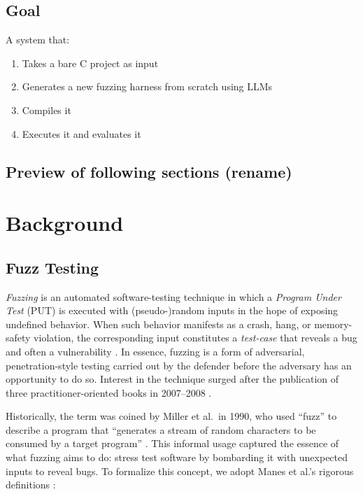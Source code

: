 \documentclass[
  a4paper,
  DIV=11,
  numbers=noendperiod]{scrreprt}
\providecommand{\tightlist}{%
  \setlength{\itemsep}{0pt}\setlength{\parskip}{0pt}}
\theoremstyle{definition}
\theoremstyle{remark}
\begin{document}
\section{Goal}\label{goal}

A system that:

\begin{enumerate}
\def\labelenumi{\arabic{enumi}.}
\tightlist
\item
  Takes a bare C project as input
\item
  Generates a new fuzzing harness from scratch using LLMs
\item
  Compiles it
\item
  Executes it and evaluates it
\end{enumerate}

\section{Preview of following sections
(rename)}\label{preview-of-following-sections-rename}


\chapter{Background}\label{background}

\section{Fuzz Testing}\label{fuzz-testing}

\emph{Fuzzing} is an automated software-testing technique in which a
\emph{Program Under Test} (PUT) is executed with (pseudo-)random inputs
in the hope of exposing undefined behavior. When such behavior manifests
as a crash, hang, or memory-safety violation, the corresponding input
constitutes a \emph{test-case} that reveals a bug and often a
vulnerability \autocite{manes2019}. In essence, fuzzing is a form of
adversarial, penetration-style testing carried out by the defender
before the adversary has an opportunity to do so. Interest in the
technique surged after the publication of three practitioner-oriented
books in 2007--2008 \autocite{takanen2018,sutton2007,rathaus2007}.

Historically, the term was coined by Miller et al.~in 1990, who used
``fuzz'' to describe a program that ``generates a stream of random
characters to be consumed by a target program'' \autocite{miller1990}.
This informal usage captured the essence of what fuzzing aims to do:
stress test software by bombarding it with unexpected inputs to reveal
bugs. To formalize this concept, we adopt Manes et al.'s rigorous
definitions \autocite{manes2019}:
\end{document}
